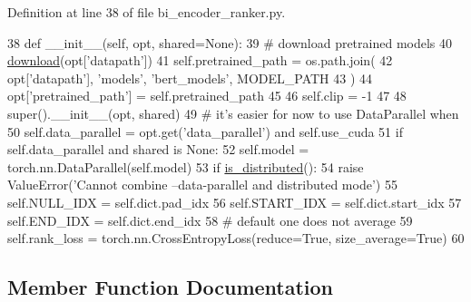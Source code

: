 Definition at line 38 of file bi\+\_\+encoder\+\_\+ranker.\+py.


\begin{DoxyCode}
38     \textcolor{keyword}{def }\_\_init\_\_(self, opt, shared=None):
39         \textcolor{comment}{# download pretrained models}
40         \hyperlink{namespaceparlai_1_1core_1_1build__data_ab74f0e428f05e5d91fa93c8afb367622}{download}(opt[\textcolor{stringliteral}{'datapath'}])
41         self.pretrained\_path = os.path.join(
42             opt[\textcolor{stringliteral}{'datapath'}], \textcolor{stringliteral}{'models'}, \textcolor{stringliteral}{'bert\_models'}, MODEL\_PATH
43         )
44         opt[\textcolor{stringliteral}{'pretrained\_path'}] = self.pretrained\_path
45 
46         self.clip = -1
47 
48         super().\_\_init\_\_(opt, shared)
49         \textcolor{comment}{# it's easier for now to use DataParallel when}
50         self.data\_parallel = opt.get(\textcolor{stringliteral}{'data\_parallel'}) \textcolor{keywordflow}{and} self.use\_cuda
51         \textcolor{keywordflow}{if} self.data\_parallel \textcolor{keywordflow}{and} shared \textcolor{keywordflow}{is} \textcolor{keywordtype}{None}:
52             self.model = torch.nn.DataParallel(self.model)
53         \textcolor{keywordflow}{if} \hyperlink{namespaceparlai_1_1utils_1_1distributed_a023acb5e3b66e1f27e21247c35661279}{is\_distributed}():
54             \textcolor{keywordflow}{raise} ValueError(\textcolor{stringliteral}{'Cannot combine --data-parallel and distributed mode'})
55         self.NULL\_IDX = self.dict.pad\_idx
56         self.START\_IDX = self.dict.start\_idx
57         self.END\_IDX = self.dict.end\_idx
58         \textcolor{comment}{# default one does not average}
59         self.rank\_loss = torch.nn.CrossEntropyLoss(reduce=\textcolor{keyword}{True}, size\_average=\textcolor{keyword}{True})
60 
\end{DoxyCode}


\subsection{Member Function Documentation}
\mbox{\label{classparlai_1_1agents_1_1bert__ranker_1_1bi__encoder__ranker_1_1BiEncoderRankerAgent_a94b0668eadb20cdd95bd5f95641fc2a6}} 
